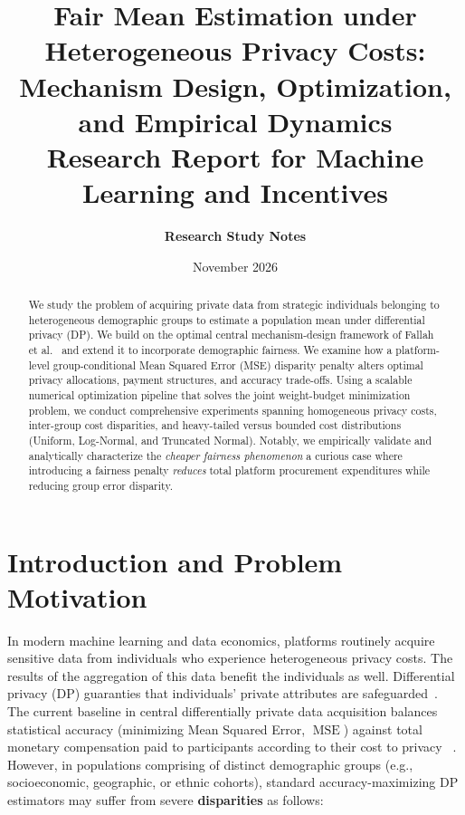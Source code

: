 \documentclass[11pt,a4paper]{article}
\title{\textbf{Fair Mean Estimation under Heterogeneous Privacy Costs:\\Mechanism Design, Optimization, and Empirical Dynamics}\\[0.5em]
\large Research Report for Machine Learning and Incentives}
\author{\textbf{Research Study Notes}}
\date{November 2026}
\newcommand{\MSE}{\operatorname{MSE}}
\begin{document}
\maketitle

\begin{abstract}
We study the problem of acquiring private data from strategic individuals belonging to heterogeneous demographic groups to estimate a population mean under differential privacy (DP). We build on the optimal central mechanism-design framework of Fallah et al.~\cite{fallah2023optimal} and extend it to incorporate demographic fairness. We examine how a platform-level group-conditional Mean Squared Error (MSE) disparity penalty alters optimal privacy allocations, payment structures, and accuracy trade-offs. Using a scalable numerical optimization pipeline that solves the joint weight-budget minimization problem, we conduct comprehensive experiments spanning homogeneous privacy costs, inter-group cost disparities, and heavy-tailed versus bounded cost distributions (Uniform, Log-Normal, and Truncated Normal). Notably, we empirically validate and analytically characterize the \emph{cheaper fairness phenomenon} a curious case where introducing a fairness penalty \emph{reduces} total platform procurement expenditures while reducing group error disparity.
\end{abstract}

\newpage

\section{Introduction and Problem Motivation}

In modern machine learning and data economics, platforms routinely acquire sensitive data from individuals who experience heterogeneous privacy costs. The results of the aggregation of this data benefit the individuals as well. Differential privacy (DP) guaranties that individuals' private attributes are safeguarded~\cite{dwork2006calibrating,dwork2014algorithmic}. The current baseline in central differentially private data acquisition balances statistical accuracy (minimizing Mean Squared Error, $\MSE$) against total monetary compensation paid to participants according to their cost to privacy ~\cite{fallah2023optimal}. However, in populations comprising of distinct demographic groups (e.g., socioeconomic, geographic, or ethnic cohorts), standard accuracy-maximizing DP estimators may suffer from severe \textbf{disparities} as follows:
\end{document}
